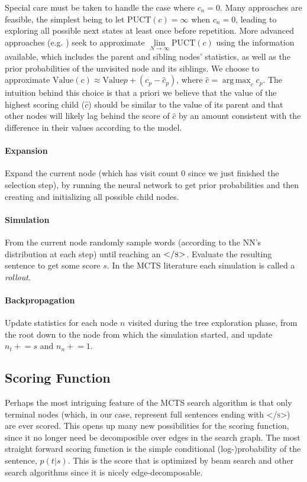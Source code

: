 \documentclass[11pt,a4paper]{article}
\newcommand{\pluseq}{\mathrel{+}=}
\DeclareMathOperator*{\argmax}{arg\,max}
\begin{document}
Special care must be taken to handle the case where $c_n = 0$. Many approaches
are feasible, the simplest being to let $\text{PUCT}(c) = \infty$ when $c_n =
0$, leading to exploring all possible next states at least once before
repetition. More advanced approaches (e.g. ) seek
to approximate $\lim\limits_{N \to \infty} \text{PUCT}(c)$ using the
information available, which includes the parent and sibling nodes' statistics,
as well as the prior probabilities of the unvisited node and its siblings. We
choose to approximate $\text{Value}(c) \approx \text{Value}{p} + (c_p -
\hat{c}_p)$, where $\hat{c} = \argmax_{c} c_p$. The intuition behind this
choice is that a priori we believe that the value of the highest scoring child
($\hat{c}$) should be similar to the value of its parent and that other nodes
will likely lag behind the score of $\hat{c}$ by an amount consistent with the
difference in their values according to the model.

\paragraph{Expansion}
Expand the current node (which has visit count 0 since we just finished the
selection step), by running the neural network to get prior probabilities and
then creating and initializing all possible child nodes.

\paragraph{Simulation}
From the current node randomly sample words (according to the NN's distribution
at each step) until reaching an $\textsc{</s>}$. Evaluate the resulting
sentence to get some score $s$. In the MCTS literature each simulation is
called a \emph{rollout}.

\paragraph{Backpropagation}
Update statistics for each node $n$ visited during the tree exploration phase,
from the root down to the node from which the simulation started, and update
$n_t \pluseq s$ and $n_n \pluseq 1$.

\subsection{Scoring Function}
\label{sec:mcts_score}
Perhaps the most intriguing feature of the MCTS search algorithm is that only
terminal nodes (which, in our case, represent full sentences ending with
\textsc{</s>}) are ever scored. This opens up many new possibilities for the
scoring function, since it no longer need be decomposible over edges in the
search graph. The most straight forward scoring function is the simple
conditional (log-)probability of the sentence, $p(t|s)$. This is the score that
is optimized by beam search and other search algorithms since it is nicely
edge-decomposable.
\end{document}
